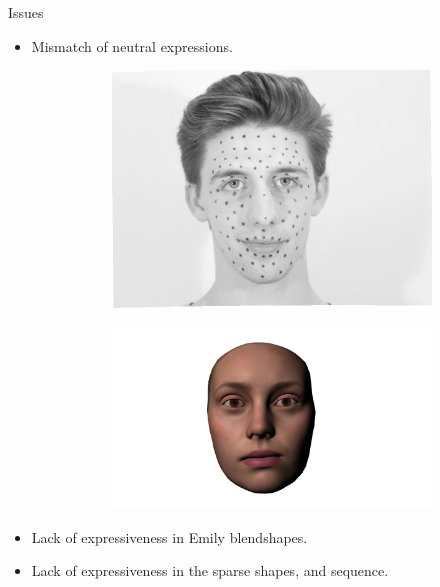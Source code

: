 \documentclass{beamer}
\begin{document}
\begin{frame}{Issues}
\begin{itemize}
	\item Mismatch of neutral expressions.
	\begin{figure}
        \centering
        \begin{subfigure}[b]{0.3\textwidth}
                \includegraphics[width=\textwidth]{img/Richard2neutral}
        \end{subfigure}
        \begin{subfigure}[b]{0.4\textwidth}
                \includegraphics[width=\textwidth]{img/emily_neutral}
        \end{subfigure}
     \end{figure}
     \item Lack of expressiveness in Emily blendshapes.
     \item Lack of expressiveness in the sparse shapes, and sequence.

\end{itemize}
\end{frame}
\end{document}
